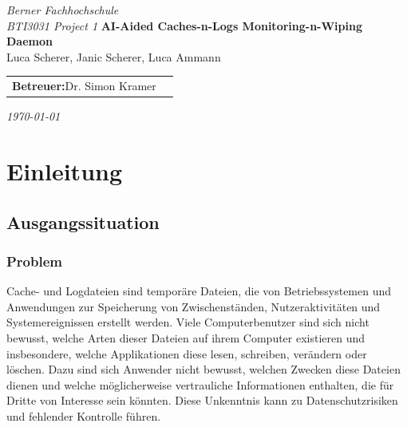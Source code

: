 \documentclass[a4paper,12pt]{report}
\begin{document}
    \begin{titlepage}
        \centering
        \textit{Berner Fachhochschule}\\[0.2em]
        \textit{BTI3031 Project 1}
        \vfill
        {\huge \textbf{AI-Aided Caches-n-Logs Monitoring-n-Wiping Daemon}}\\[4em]
        {\large Luca Scherer, Janic Scherer, Luca Ammann }\\[0.5em]
        \begin{tabular}{ll}
            \textbf{Betreuer:}\hspace{0.5em}Dr. Simon Kramer \\
        \end{tabular}

        \vfill
        \textit{\today}
    \end{titlepage}

    \begin{abstract}
        \ldots
    \end{abstract}

    \tableofcontents
    \listoftables
    \listoffigures
    \lstlistoflistings



    \chapter{Einleitung}


    \section{Ausgangssituation}

    \subsection{Problem}\label{subsec:problem}
    Cache- und Logdateien sind temporäre Dateien, die von Betriebssystemen und
    Anwendungen zur Speicherung von Zwischenständen, Nutzeraktivitäten und
    Systemereignissen erstellt werden.
    Viele Computerbenutzer sind sich nicht bewusst, welche Arten dieser Dateien auf ihrem
    Computer existieren und insbesondere, welche Applikationen diese lesen, schreiben,
    verändern oder löschen.
    Dazu sind sich Anwender nicht bewusst, welchen Zwecken
    diese Dateien dienen und welche möglicherweise vertrauliche Informationen enthalten,
    die für Dritte von Interesse sein könnten.
    Diese Unkenntnis kann zu Datenschutzrisiken
    und fehlender Kontrolle führen.
\end{document}
